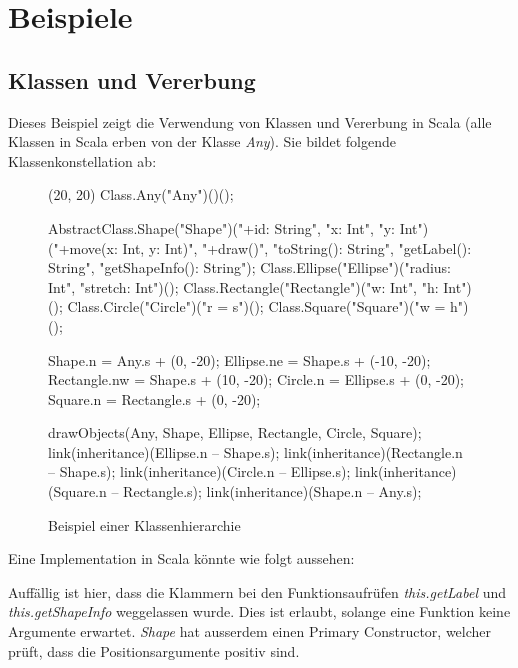\chapter{Beispiele}


\section{Klassen und Vererbung}
\label{sec:bspClasses}

Dieses Beispiel zeigt die Verwendung von Klassen und Vererbung in Scala
(alle Klassen in Scala erben von der Klasse \emph{Any}). Sie bildet
folgende Klassenkonstellation ab:


\begin{figure}[H]
	\centering
	\begin{emp}[classdiag](20, 20)
		Class.Any("Any")()();

		AbstractClass.Shape("Shape")("+id: String", "x: Int", "y: Int")
			("+move(x: Int, y: Int)", "+draw()", "toString(): String", "getLabel(): String", "getShapeInfo(): String");
		Class.Ellipse("Ellipse")("radius: Int", "stretch: Int")();
		Class.Rectangle("Rectangle")("w: Int", "h: Int")();
		Class.Circle("Circle")("{r = s}")();
		Class.Square("Square")("{w = h}")();

		Shape.n = Any.s + (0, -20);
		Ellipse.ne = Shape.s + (-10, -20);
		Rectangle.nw = Shape.s + (10, -20);
		Circle.n = Ellipse.s + (0, -20);
		Square.n = Rectangle.s + (0, -20);

		drawObjects(Any, Shape, Ellipse, Rectangle, Circle, Square);
		link(inheritance)(Ellipse.n -- Shape.s);
		link(inheritance)(Rectangle.n -- Shape.s);
		link(inheritance)(Circle.n -- Ellipse.s);
		link(inheritance)(Square.n -- Rectangle.s);
		link(inheritance)(Shape.n -- Any.s);

	\end{emp}
	\caption{Beispiel einer Klassenhierarchie}
	\label{fig:covariance}
\end{figure}

Eine Implementation in Scala könnte wie folgt aussehen: 



Auffällig ist hier, dass die Klammern bei den Funktionsaufrüfen \emph{this.getLabel} 
und \emph{this.getShapeInfo} weggelassen wurde. Dies ist erlaubt, solange eine Funktion
keine Argumente erwartet. \emph{Shape} hat ausserdem einen Primary Constructor, welcher prüft,
dass die Positionsargumente positiv sind.

